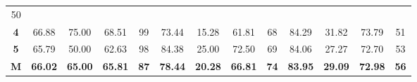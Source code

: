 \begin{table}[H]
{\begin{tabular}{ccccccccccccc}
			\multicolumn{1}{c|}{50} \\ \cline{2-13} 
			\multicolumn{1}{c|}{\cellcolor[HTML]{D9D9D9}\textbf{4}} &
			\multicolumn{1}{c|}{66.88} &
			\multicolumn{1}{c|}{75.00} &
			\multicolumn{1}{c|}{68.51} &
			\multicolumn{1}{c|}{99} &
			\multicolumn{1}{c|}{73.44} &
			\multicolumn{1}{c|}{15.28} &
			\multicolumn{1}{c|}{61.81} &
			\multicolumn{1}{c|}{68} &
			\multicolumn{1}{c|}{84.29} &
			\multicolumn{1}{c|}{31.82} &
			\multicolumn{1}{c|}{73.79} &
			\multicolumn{1}{c|}{51} \\ \cline{2-13} 
			\multicolumn{1}{c|}{\cellcolor[HTML]{D9D9D9}\textbf{5}} &
			\multicolumn{1}{c|}{65.79} &
			\multicolumn{1}{c|}{50.00} &
			\multicolumn{1}{c|}{62.63} &
			\multicolumn{1}{c|}{98} &
			\multicolumn{1}{c|}{84.38} &
			\multicolumn{1}{c|}{25.00} &
			\multicolumn{1}{c|}{72.50} &
			\multicolumn{1}{c|}{69} &
			\multicolumn{1}{c|}{84.06} &
			\multicolumn{1}{c|}{27.27} &
			\multicolumn{1}{c|}{72.70} &
			\multicolumn{1}{c|}{53} \\ \cline{2-13} 
			\multicolumn{1}{c|}{\cellcolor[HTML]{FFFF00}\textbf{M}} &
			\multicolumn{1}{c|}{\textbf{66.02}} &
			\multicolumn{1}{c|}{\textbf{65.00}} &
			\multicolumn{1}{c|}{\textbf{65.81}} &
			\multicolumn{1}{c|}{\textbf{87}} &
			\multicolumn{1}{c|}{\textbf{78.44}} &
			\multicolumn{1}{c|}{\textbf{20.28}} &
			\multicolumn{1}{c|}{\textbf{66.81}} &
			\multicolumn{1}{c|}{\textbf{74}} &
			\multicolumn{1}{c|}{\textbf{83.95}} &
			\multicolumn{1}{c|}{\textbf{29.09}} &
			\multicolumn{1}{c|}{\textbf{72.98}} &
			\multicolumn{1}{c|}{\textbf{56}} \\ \cline{2-13} 
		\end{tabular}%
	}
\end{table}
